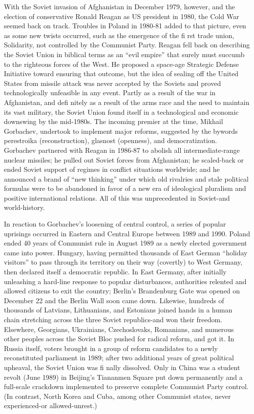 \documentclass[
  openany]{book}
\begin{document}
With the Soviet invasion of Afghanistan in December 1979, however, and the election of conservative Ronald Reagan as US president in 1980, the Cold War seemed back on track. Troubles in Poland in 1980-81 added to that picture, even as some new twists occurred, such as the emergence of the fi rst trade union, Solidarity, not controlled by the Communist Party. Reagan fell back on describing the Soviet Union in biblical terms as an ``evil empire'' that surely must succumb to the righteous forces of the West. He proposed a space-age Strategic Defense Initiative toward ensuring that outcome, but the idea of sealing off the United States from missile attack was never accepted by the Soviets and proved technologically unfeasible in any event. Partly as a result of the war in Afghanistan, and defi nitely as a result of the arms race and the need to maintain its vast military, the Soviet Union found itself in a technological and economic downswing by the mid-1980s. The incoming premier at the time, Mikhail Gorbachev, undertook to implement major reforms, suggested by the bywords perestroika (reconstruction), glasnost (openness), and democratization. Gorbachev partnered with Reagan in 1986-87 to abolish all intermediate-range nuclear missiles; he pulled out Soviet forces from Afghanistan; he scaled-back or ended Soviet support of regimes in conflict situations worldwide; and he announced a brand of ``new thinking'' under which old rivalries and stale political formulas were to be abandoned in favor of a new era of ideological pluralism and positive international relations. All of this was unprecedented in Soviet-and world-history.

In reaction to Gorbachev's loosening of central control, a series of popular uprisings occurred in Eastern and Central Europe between 1989 and 1990. Poland ended 40 years of Communist rule in August 1989 as a newly elected government came into power. Hungary, having permitted thousands of East German ``holiday visitors'' to pass through its territory on their way (covertly) to West Germany, then declared itself a democratic republic. In East Germany, after initially unleashing a hard-line response to popular disturbances, authorities relented and allowed citizens to exit the country; Berlin's Brandenburg Gate was opened on December 22 and the Berlin Wall soon came down. Likewise, hundreds of thousands of Latvians, Lithuanians, and Estonians joined hands in a human chain stretching across the three Soviet republics-and won their freedom. Elsewhere, Georgians, Ukrainians, Czechoslovaks, Romanians, and numerous other peoples across the Soviet Bloc pushed for radical reform, and got it. In Russia itself, voters brought in a group of reform candidates to a newly reconstituted parliament in 1989; after two additional years of great political upheaval, the Soviet Union was fi nally dissolved. Only in China was a student revolt (June 1989) in Beijing's Tiananmen Square put down permanently and a full-scale crackdown implemented to preserve complete Communist Party control. (In contrast, North Korea and Cuba, among other Communist states, never experienced-or allowed-unrest.)
\end{document}
